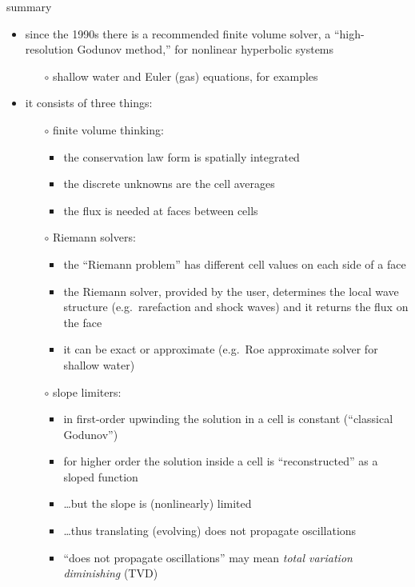 \documentclass[10pt,hyperref]{beamer}
\begin{document}
\begin{frame}{summary}

\begin{itemize}
\item since the 1990s there is a recommended finite volume solver, a ``high-resolution Godunov method,'' for nonlinear hyperbolic systems
    \begin{itemize}
    \item[$\circ$] shallow water and Euler (gas) equations, for examples
    \end{itemize}
\item it consists of three things:
    \begin{itemize}
    \item[$\circ$] \alert{finite volume thinking}:
        \begin{itemize}
        \item the conservation law form is spatially integrated
        \item the discrete unknowns are the cell averages
        \item the flux is needed at faces between cells
        \end{itemize}
    \item[$\circ$] \alert{Riemann solvers}:
        \begin{itemize}
        \item the ``Riemann problem'' has different cell values on each side of a face
        \item the Riemann solver, provided by the user, determines the local wave structure (e.g.~rarefaction and shock waves) and it returns the flux on the face
        \item it can be exact or approximate (e.g.~Roe approximate solver for shallow water)
        \end{itemize}
    \item[$\circ$] \alert{slope limiters}:
        \begin{itemize}
        \item in first-order upwinding the solution in a cell is constant (``classical Godunov'')
        \item for higher order the solution inside a cell is ``reconstructed'' as a sloped function
        \item \dots but the slope is (nonlinearly) limited
        \item \dots thus translating (evolving) does not propagate oscillations
        \item ``does not propagate oscillations'' may mean \emph{total variation diminishing} (TVD)
        \end{itemize}
    \end{itemize}
\end{itemize}
\end{frame}
\end{document}
